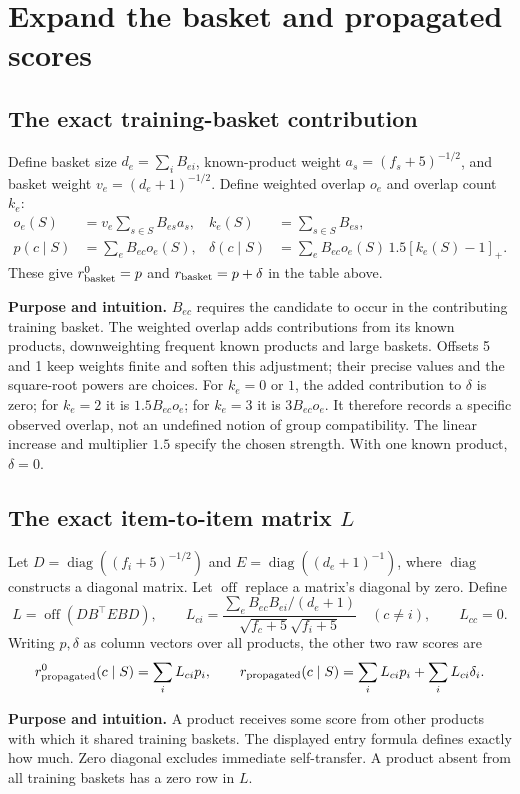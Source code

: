 \documentclass[11pt,a4paper]{article}
\newcommand{\off}{\operatorname{off}}\newcommand{\diag}{\operatorname{diag}}
\newcommand{\why}{\par\textbf{Purpose and intuition.} }
\numberwithin{equation}{section}
\begin{document}
\section{Expand the basket and propagated scores}\label{baskets}
\subsection{The exact training-basket contribution}
Define basket size $d_e=\sum_iB_{ei}$, known-product weight $a_s=(f_s+5)^{-1/2}$,
and basket weight $v_e=(d_e+1)^{-1/2}$. Define weighted overlap $o_e$ and overlap count $k_e$:
\begin{align}
o_e(S)&=v_e\sum_{s\in S}B_{es}a_s,& k_e(S)&=\sum_{s\in S}B_{es},\\
p(c\mid S)&=\sum_e B_{ec}o_e(S),&
\delta(c\mid S)&=\sum_e B_{ec}o_e(S)\,1.5[k_e(S)-1]_+.\label{delta}
\end{align}
These give $r_{\rm basket}^0=p$ and $r_{\rm basket}=p+\delta$ in the table above.
\why $B_{ec}$ requires the candidate to occur in the contributing training basket.
The weighted overlap adds contributions from its known products, downweighting frequent
known products and large baskets. Offsets 5 and 1 keep weights finite and soften this
adjustment; their precise values and the square-root powers are choices.
For $k_e=0$ or $1$, the added contribution to $\delta$ is zero; for $k_e=2$ it is
$1.5B_{ec}o_e$; for $k_e=3$ it is $3B_{ec}o_e$. It therefore records a specific
observed overlap, not an undefined notion of group compatibility. The linear increase
and multiplier $1.5$ specify the chosen strength. With one known product, $\delta=0$.

\subsection{The exact item-to-item matrix $L$}
Let $D=\diag((f_i+5)^{-1/2})$ and $E=\diag((d_e+1)^{-1})$, where $\diag$ constructs
a diagonal matrix. Let $\off$ replace a matrix's diagonal by zero. Define
\begin{equation}\label{L}
L=\off(DB^\top EBD),\qquad
L_{ci}=\frac{\sum_e B_{ec}B_{ei}/(d_e+1)}{\sqrt{f_c+5}\sqrt{f_i+5}}\quad(c\ne i),
\qquad L_{cc}=0.
\end{equation}
Writing $p,\delta$ as column vectors over all products, the other two raw scores are
\begin{equation}
r_{\rm propagated}^0(c\mid S)=\sum_i L_{ci}p_i,\qquad
r_{\rm propagated}(c\mid S)=\sum_iL_{ci}p_i+\sum_iL_{ci}\delta_i.
\end{equation}
\why A product receives some score from other products with which it shared training
baskets. The displayed entry formula defines exactly how much. Zero diagonal excludes
immediate self-transfer. A product absent from all training baskets has a zero row in $L$.
\end{document}

